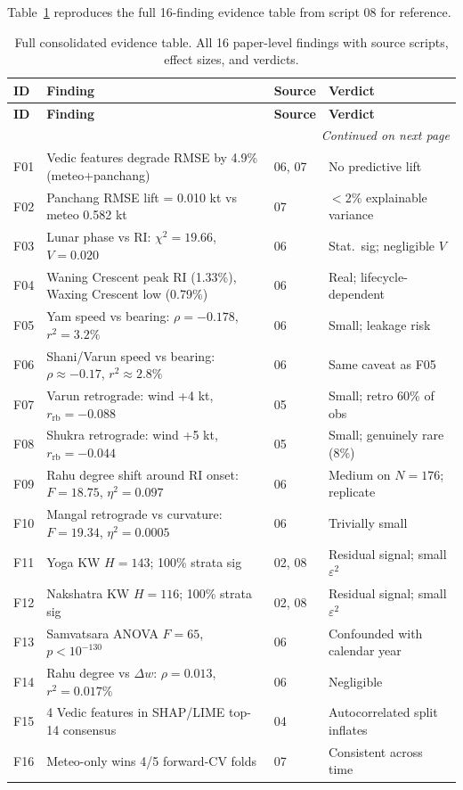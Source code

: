 \documentclass[12pt,a4paper]{article}
\begin{document}
Table~\ref{tab:evidence_full} reproduces the full 16-finding evidence table
from script 08 for reference.

\begin{longtable}{p{2.5cm}p{5cm}lp{3.5cm}}
  \caption{Full consolidated evidence table. All 16 paper-level findings with
           source scripts, effect sizes, and verdicts.}
  \label{tab:evidence_full} \\
  \toprule
  \textbf{ID} & \textbf{Finding} & \textbf{Source} & \textbf{Verdict} \\
  \midrule
  \endfirsthead
  \toprule
  \textbf{ID} & \textbf{Finding} & \textbf{Source} & \textbf{Verdict} \\
  \midrule
  \endhead
  \midrule \multicolumn{4}{r}{\textit{Continued on next page}} \\
  \endfoot
  \bottomrule
  \endlastfoot

  F01 & Vedic features degrade RMSE by 4.9\% (meteo+panchang) & 06, 07 & No predictive lift \\
  F02 & Panchang RMSE lift = 0.010 kt vs meteo 0.582 kt & 07 & $<$2\% explainable variance \\
  F03 & Lunar phase vs RI: $\chi^2=19.66$, $V=0.020$ & 06 & Stat.\ sig; negligible $V$ \\
  F04 & Waning Crescent peak RI (1.33\%), Waxing Crescent low (0.79\%) & 06 & Real; lifecycle-dependent \\
  F05 & Yam speed vs bearing: $\rho=-0.178$, $r^2=3.2\%$ & 06 & Small; leakage risk \\
  F06 & Shani/Varun speed vs bearing: $\rho\approx-0.17$, $r^2\approx2.8\%$ & 06 & Same caveat as F05 \\
  F07 & Varun retrograde: wind +4 kt, $r_\text{rb}=-0.088$ & 05 & Small; retro 60\% of obs \\
  F08 & Shukra retrograde: wind +5 kt, $r_\text{rb}=-0.044$ & 05 & Small; genuinely rare (8\%) \\
  F09 & Rahu degree shift around RI onset: $F=18.75$, $\eta^2=0.097$ & 06 & Medium on $N=176$; replicate \\
  F10 & Mangal retrograde vs curvature: $F=19.34$, $\eta^2=0.0005$ & 06 & Trivially small \\
  F11 & Yoga KW $H=143$; 100\% strata sig & 02, 08 & Residual signal; small $\varepsilon^2$ \\
  F12 & Nakshatra KW $H=116$; 100\% strata sig & 02, 08 & Residual signal; small $\varepsilon^2$ \\
  F13 & Samvatsara ANOVA $F=65$, $p<10^{-130}$ & 06 & Confounded with calendar year \\
  F14 & Rahu degree vs $\Delta w$: $\rho=0.013$, $r^2=0.017\%$ & 06 & Negligible \\
  F15 & 4 Vedic features in SHAP/LIME top-14 consensus & 04 & Autocorrelated split inflates \\
  F16 & Meteo-only wins 4/5 forward-CV folds & 07 & Consistent across time \\

\end{longtable}
\end{document}
